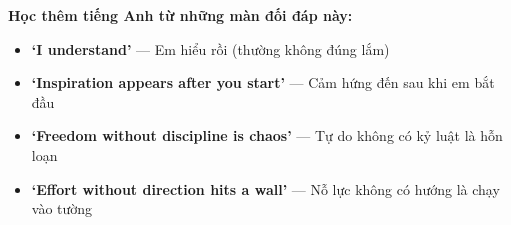 \begin{ghinhoanh}
\textbf{Học thêm tiếng Anh từ những màn đối đáp này:}\\[4pt]
\begin{itemize}[leftmargin=*]
  \item \textbf{`I understand'} --- Em hiểu rồi (thường không đúng lắm)
  \item \textbf{`Inspiration appears after you start'} --- Cảm hứng đến sau khi em bắt đầu
  \item \textbf{`Freedom without discipline is chaos'} --- Tự do không có kỷ luật là hỗn loạn
  \item \textbf{`Effort without direction hits a wall'} --- Nỗ lực không có hướng là chạy vào tường
\end{itemize}
\end{ghinhoanh}
